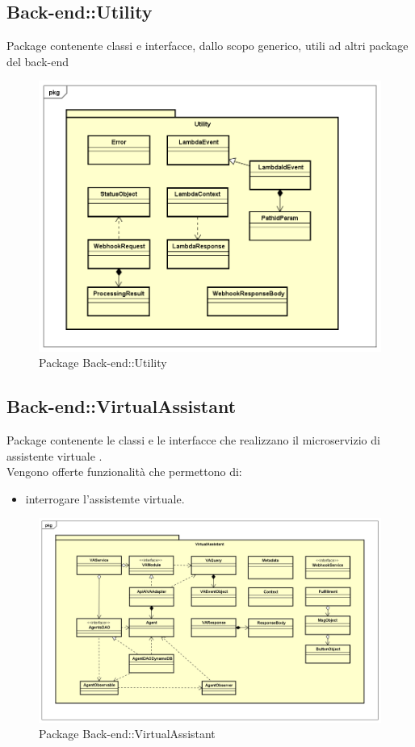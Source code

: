 \subsection{Back-end::Utility}
Package contenente classi e interfacce, dallo scopo generico, utili ad altri package del back-end
\begin{figure}[h] \centering \includegraphics[width=\textwidth,height=\textheight,keepaspectratio]{images/diagrams/back-end/Official_Backend_0304/Utility.png}
\caption{Package Back-end::Utility}
\end{figure}
\newpage

\subsection{Back-end::VirtualAssistant}
Package contenente le classi e le interfacce che realizzano il microservizio di assistente virtuale .\\ Vengono offerte funzionalità che permettono di: \begin{itemize} \item interrogare l'assistemte virtuale. \end{itemize}
\begin{figure}[h] \centering \includegraphics[width=\textwidth,height=\textheight,keepaspectratio]{images/diagrams/back-end/Official_Backend_0304/VirtualAssistant.png}
\caption{Package Back-end::VirtualAssistant}
\end{figure}
\newpage
